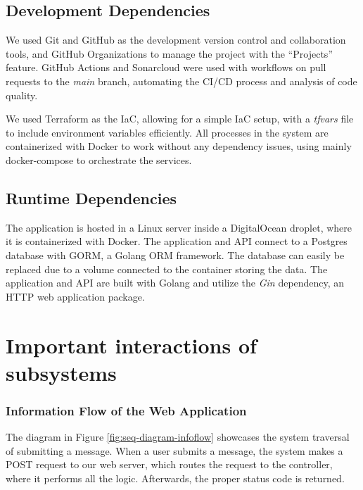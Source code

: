 \documentclass[12pt, a4paper, oneside]{book}
\begin{document}
\subsection{Development Dependencies}
We used Git and GitHub as the development version control and collaboration tools, and GitHub Organizations to manage the project with the “Projects” feature. 
GitHub Actions and Sonarcloud were used with workflows on pull requests to the \textit{main} branch, automating the CI/CD process and analysis of code quality.\bigskip

We used Terraform as the IaC, allowing for a simple IaC setup, with a \textit{tfvars} file to include environment variables efficiently.
All processes in the system are containerized with Docker to work without any dependency issues, using mainly docker-compose to orchestrate the services.\bigskip


\subsection{Runtime Dependencies}
The application is hosted in a Linux server inside a DigitalOcean droplet, where it is containerized with Docker.
The application and API connect to a Postgres database with GORM, a Golang ORM framework.
The database can easily be replaced due to a volume connected to the container storing the data.
The application and API are built with Golang and utilize the \textit{Gin} dependency, an HTTP web application package.

\section{Important interactions of subsystems}

\subsubsection{Information Flow of the Web Application}
The diagram in Figure \ref{fig:seq-diagram-infoflow} showcases the system traversal of submitting a message.
When a user submits a message, the system makes a POST request to our web server, which routes the request to the controller, where it performs all the logic.
Afterwards, the proper status code is returned.
\end{document}
